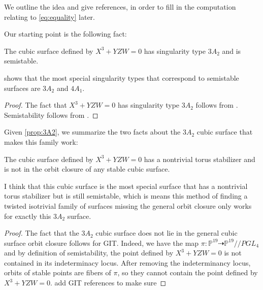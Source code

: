 \documentclass[12pt,reqno]{amsart}
\numberwithin{equation}{section}
\begin{document}
We outline the idea and give references, in order to fill in the computation relating to \eqref{eq:equality} later. 

Our starting point is the following fact:
\begin{proposition}
\label{prop:3A2}
The cubic surface defined by $X^3 + YZW = 0$ has singularity type $3A_2$ and is semistable.
\end{proposition}

\begin{remark}
\cite[Proposition 2.2]{N05} shows that the most special singularity types that correspond to semistable surfaces are $3A_2$ and $4A_1$. 
\end{remark}

\begin{proof}
The fact that $X^3 + YZW=0$ has singularity type $3A_2$ follows from \cite[Proof of 3.1.12]{N00}. Semistability follows from \cite[Proposition 2.3]{N05}.
\end{proof}

Given \autoref{prop:3A2}, we summarize the two facts about the $3A_2$ cubic surface that makes this family work:
\begin{proposition}
\label{prop:twofacts}
The cubic surface defined by $X^3 + YZW = 0$ has a nontrivial torus stabilizer and is not in the orbit closure of any stable cubic surface.
\end{proposition}

\begin{remark}
  I think that this cubic surface is the most special surface that has
  a nontrivial torus stabilizer but is still semistable, which is
  means this method of finding a twisted isotrivial family of surfaces
  missing the general orbit closure only works for exactly this $3A_2$
  surface.
\end{remark}

\begin{proof}
  The fact that the $3A_2$ cubic surface does not lie in the general
  cubic surface orbit closure follows for GIT. Indeed, we have the map
  $\pi: \mathbb{P}^{19}\dashrightarrow \mathbb{P}^{19}//PGL_4$ and by
  definition of semistability, the point defined by $X^3 + YZW = 0$ is
  not contained in its indeterminacy locus. After removing the
  indeterminancy locus, orbits of stable points are fibers of $\pi$,
  so they cannot contain the point defined by $X^3 + YZW =
  0$. {\color{red} add GIT references to make sure}
\end{proof}
\end{document}
